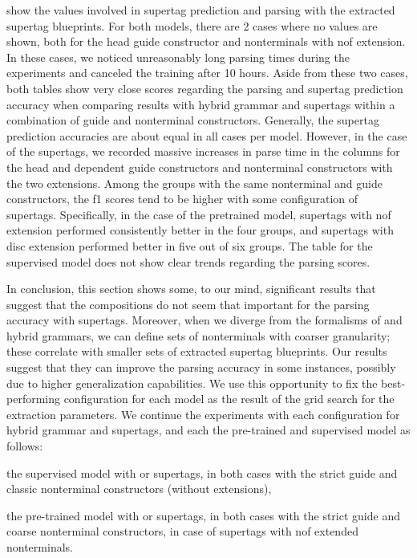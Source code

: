\documentclass[../../document.tex]{subfiles}
\begin{document}
     show the values involved in supertag prediction and parsing with the extracted supertag blueprints.
    For both models, there are 2 cases where no values are shown, both for the head guide constructor and nonterminals with nof extension.
    In these cases, we noticed unreasonably long parsing times during the experiments and canceled the training after 10 hours.
    Aside from these two cases, both tables show very close scores regarding the parsing and supertag prediction accuracy when comparing results with hybrid grammar and  supertags within a combination of guide and nonterminal constructors.
    Generally, the supertag prediction accuracies are about equal in all cases per model.
    However, in the case of the  supertags, we recorded massive increases in parse time in the columns for the head and dependent guide constructors and nonterminal constructors with the two extensions.
    Among the groups with the same nonterminal and guide constructors, the f1 scores tend to be higher with some configuration of  supertags.
    Specifically, in the case of the pretrained model,  supertags with nof extension performed consistently better in the four groups, and  supertags with disc extension performed better in five out of six groups.
    The table for the supervised model does not show clear trends regarding the parsing scores.

    In conclusion, this section shows some, to our mind, significant results that suggest that the  compositions do not seem that important for the parsing accuracy with supertags.
    Moreover, when we diverge from the formalisms of  and hybrid grammars, we can define sets of nonterminals with coarser granularity; these correlate with smaller sets of extracted supertag blueprints.
    Our results suggest that they can improve the parsing accuracy in some instances, possibly due to higher generalization capabilities.
    We use this opportunity to fix the best-performing configuration for each model as the result of the grid search for the extraction parameters.
    We continue the experiments with each configuration for hybrid grammar and  supertags, and each the pre-trained and supervised model as follows:
    \begin{compactenum}
        \item the supervised model with  or  supertags, in both cases with the strict guide and classic nonterminal constructors (without extensions),
        \item the pre-trained model with  or  supertags, in both cases with the strict guide and coarse nonterminal constructors, in case of  supertags with nof extended nonterminals.
    \end{compactenum}
\end{document}

